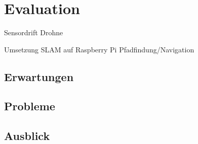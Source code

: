 \chapter{Evaluation}


Sensordrift Drohne

Umsetzung SLAM auf Raspberry Pi
Pfadfindung/Navigation




\section{Erwartungen}

\section{Probleme}




\section{Ausblick}